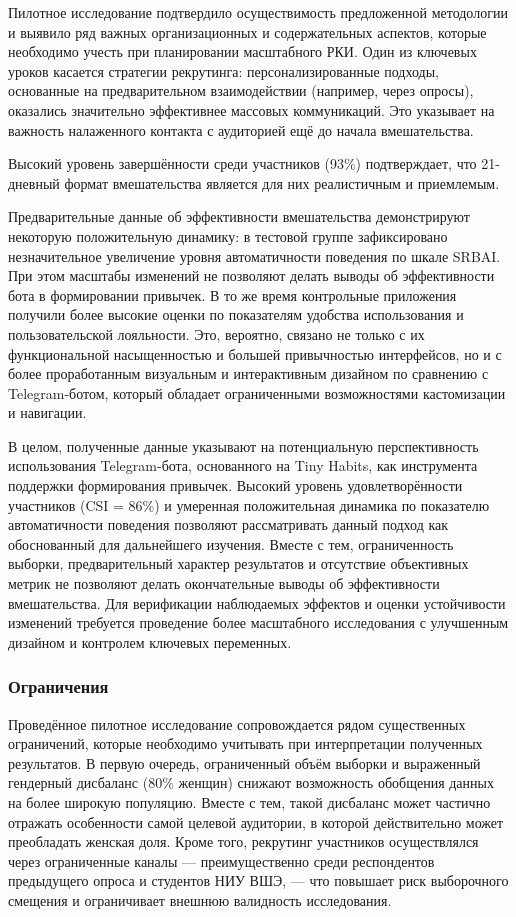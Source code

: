 \documentclass[pdflatex,sn-mathphys-num]{sn-jnl}%
\theoremstyle{thmstyleone}%
\theoremstyle{thmstyletwo}%
\theoremstyle{thmstylethree}%
\begin{document}
Пилотное исследование подтвердило осуществимость предложенной методологии и выявило ряд важных организационных и содержательных аспектов, которые необходимо учесть при планировании масштабного РКИ. Один из ключевых уроков касается стратегии рекрутинга: персонализированные подходы, основанные на предварительном взаимодействии (например, через опросы), оказались значительно эффективнее массовых коммуникаций. Это указывает на важность налаженного контакта с аудиторией ещё до начала вмешательства.

Высокий уровень завершённости среди участников (93\%) подтверждает, что 21-дневный формат вмешательства является для них реалистичным и приемлемым.

Предварительные данные об эффективности вмешательства демонстрируют некоторую положительную динамику: в тестовой группе зафиксировано незначительное увеличение уровня автоматичности поведения по шкале SRBAI. При этом масштабы изменений не позволяют делать выводы об эффективности бота в формировании привычек. В то же время контрольные приложения получили более высокие оценки по показателям удобства использования и пользовательской лояльности. Это, вероятно, связано не только с их функциональной насыщенностью и большей привычностью интерфейсов, но и с более проработанным визуальным и интерактивным дизайном по сравнению с Telegram-ботом, который обладает ограниченными возможностями кастомизации и навигации.

В целом, полученные данные указывают на потенциальную перспективность использования Telegram-бота, основанного на Tiny Habits, как инструмента поддержки формирования привычек. Высокий уровень удовлетворённости участников (CSI = 86\%) и умеренная положительная динамика по показателю автоматичности поведения позволяют рассматривать данный подход как обоснованный для дальнейшего изучения. Вместе с тем, ограниченность выборки, предварительный характер результатов и отсутствие объективных метрик не позволяют делать окончательные выводы об эффективности вмешательства. Для верификации наблюдаемых эффектов и оценки устойчивости изменений требуется проведение более масштабного исследования с улучшенным дизайном и контролем ключевых переменных.

\subsubsection{Ограничения}

Проведённое пилотное исследование сопровождается рядом существенных ограничений, которые необходимо учитывать при интерпретации полученных результатов. В первую очередь, ограниченный объём выборки и выраженный гендерный дисбаланс (80\% женщин) снижают возможность обобщения данных на более широкую популяцию. Вместе с тем, такой дисбаланс может частично отражать особенности самой целевой аудитории, в которой действительно может преобладать женская доля. Кроме того, рекрутинг участников осуществлялся через ограниченные каналы — преимущественно среди респондентов предыдущего опроса и студентов НИУ ВШЭ, — что повышает риск выборочного смещения и ограничивает внешнюю валидность исследования.
\end{document}
